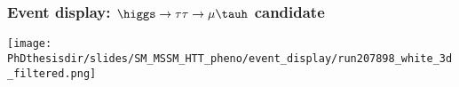 %
%

\begin{frame}
\frametitle{Event display: $\higgs\to\tau\tau\to\mu\tauh$ candidate}

\vfill

\begin{center}
\texttt{[image: \\PhDthesisdir/slides/SM\_MSSM\_HTT\_pheno/event\_display/run207898\_white\_3d\_filtered.png]}
\end{center}

\vfill
\end{frame}
